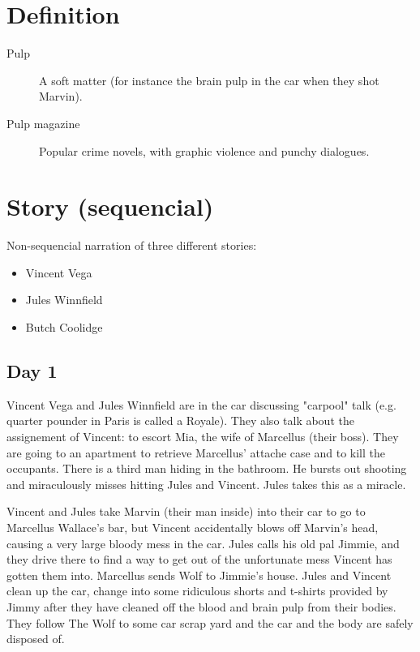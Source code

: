 \documentclass[a4paper,12pt]{article}
\begin{document}
\section{Definition}

\begin{description}
    \item [Pulp] A soft matter (for instance the brain pulp in the car when they
    shot Marvin).
    \item [Pulp magazine] Popular crime novels, with graphic violence and punchy
    dialogues.
\end{description}

\section{Story (sequencial)}

Non-sequencial narration of three different stories:
\begin{itemize}
    \item Vincent Vega
    \item Jules Winnfield
    \item Butch Coolidge
\end{itemize}


\subsection*{Day 1}

Vincent Vega and Jules Winnfield are in the car discussing "carpool" talk (e.g.
quarter pounder in Paris is called a Royale). They also talk about the assignement
of Vincent: to escort Mia, the wife of Marcellus (their boss). They are going to
an apartment to retrieve Marcellus' attache case and to kill the occupants. There
is a third man hiding in the bathroom. He bursts out shooting and miraculously
misses hitting Jules and Vincent. Jules takes this as a miracle.

Vincent and Jules take Marvin (their man inside) into their car to go to Marcellus
Wallace's bar, but Vincent accidentally blows off Marvin's head, causing a very
large bloody mess in the car. Jules calls his old pal Jimmie, and they drive there
to find a way to get out of the unfortunate mess Vincent has gotten them into.
Marcellus sends Wolf to Jimmie's house. Jules and Vincent clean up the car, change
into some ridiculous shorts and t-shirts provided by
Jimmy after they have cleaned off the blood and brain pulp from their bodies.
They follow The Wolf to some car scrap yard and the car and the body are
safely disposed of.
\end{document}
